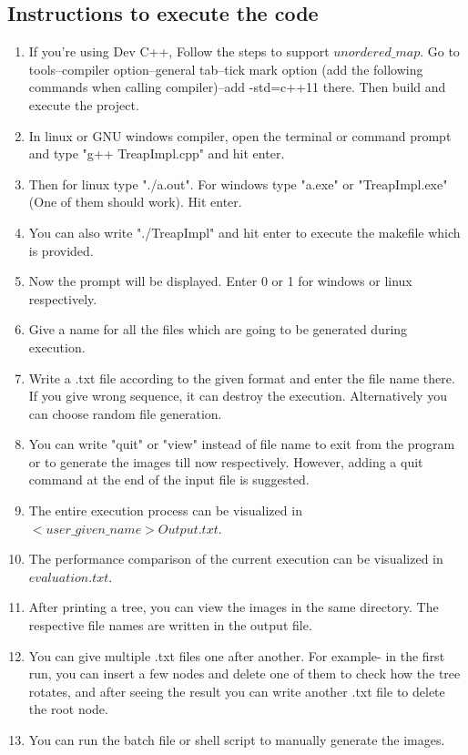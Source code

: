 \documentclass{article}
\begin{document}
\subsection{Instructions to execute the code}
\label{instn}
\begin{enumerate}
	\item If you're using Dev C++, Follow the steps to support $unordered\_map$. Go to tools--compiler option--general tab--tick mark option (add the following commands when calling compiler)--add -std=c++11 there. Then build and execute the project.
	\item In linux or GNU windows compiler, open the terminal or command prompt and type "g++ TreapImpl.cpp" and hit enter.
	\item Then for linux type "./a.out". For windows type "a.exe" or "TreapImpl.exe" (One of them should work). Hit enter.
	\item You can also write "./TreapImpl" and hit enter to execute the makefile which is provided.
	\item Now the prompt will be displayed. Enter 0 or 1 for windows or linux respectively.
	\item Give a name for all the files which are going to be generated during execution.
	\item Write a .txt file according to the given format and enter the file name there. If you give wrong sequence, it can destroy the execution. Alternatively you can choose random file generation.
	\item You can write "quit" or "view" instead of file name to exit from the program or to generate the images till now respectively. However, adding a quit command at the end of the input file is suggested.
	\item The entire execution process can be visualized in $<user\_given\_name>Output.txt$.
	\item The performance comparison of the current execution can be visualized in $evaluation.txt$.
	\item After printing a tree, you can view the images in the same directory. The respective file names are written in the output file.
	\item You can give multiple .txt files one after another. For example- in the first run, you can insert a few nodes and delete one of them to check how the tree rotates, and after seeing the result you can write another .txt file to delete the root node.
	\item You can run the batch file or shell script to manually generate the images.

\end{enumerate}
\end{document}
